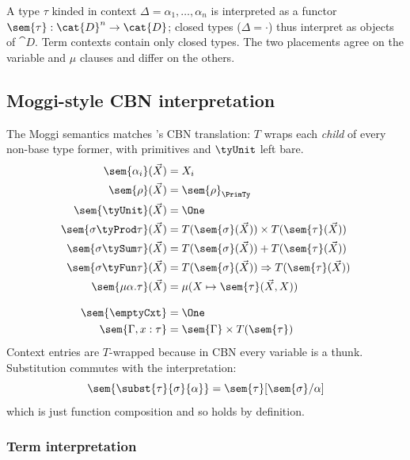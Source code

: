 A type $\tau$ kinded in context $\Delta = \alpha_1, \ldots, \alpha_n$ is interpreted as a functor
$\sem{\tau} : \cat{D}^n \to \cat{D}$; closed types ($\Delta = \cdot$) thus interpret as objects of
$\cat{D}$. Term contexts contain only closed types. The two placements agree on the variable and
$\mu$ clauses and differ on the others.

\subsection{Moggi-style CBN interpretation}
\label{sec:slicing-interpretation:moggi}

The Moggi semantics matches 's CBN translation: $T$ wraps each
\emph{child} of every non-base type former, with primitives and $\tyUnit$ left bare.
\begin{align*}
\sem{\alpha_i}(\vec{X})            & = X_i \\
\sem{\rho}(\vec{X})                & = \sem{\rho}_{\PrimTy} \\
\sem{\tyUnit}(\vec{X})             & = \One \\
\sem{\sigma \tyProd \tau}(\vec{X}) & = T(\sem{\sigma}(\vec{X})) \times T(\sem{\tau}(\vec{X})) \\
\sem{\sigma \tySum \tau}(\vec{X})  & = T(\sem{\sigma}(\vec{X})) + T(\sem{\tau}(\vec{X})) \\
\sem{\sigma \tyFun \tau}(\vec{X})  & = T(\sem{\sigma}(\vec{X})) \Rightarrow T(\sem{\tau}(\vec{X})) \\
\sem{\mu\alpha.\tau}(\vec{X})      & = \mu(X \mapsto \sem{\tau}(\vec{X}, X)) \\[3mm]
\sem{\emptyCxt}                    & = \One \\
\sem{\Gamma, x : \tau}             & = \sem{\Gamma} \times T(\sem{\tau})
\end{align*}
Context entries are $T$-wrapped because in CBN every variable is a thunk. Substitution commutes
with the interpretation:
\[
\sem{\subst{\tau}{\sigma}{\alpha}} = \sem{\tau}[\sem{\sigma}/\alpha]
\]
which is just function composition and so holds by definition.

\subsubsection{Term interpretation}
\label{sec:slicing-interpretation:moggi-terms}

